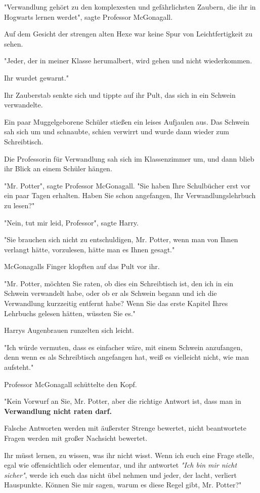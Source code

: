 {"Verwandlung gehört zu den komplexesten und gefährlichsten Zaubern, die ihr in Hogwarts lernen werdet", sagte Professor McGonagall.

Auf dem Gesicht der strengen alten Hexe war keine Spur von Leichtfertigkeit zu sehen.

"Jeder, der in meiner Klasse herumalbert, wird gehen und nicht wiederkommen.

Ihr wurdet gewarnt."

Ihr Zauberstab senkte sich und tippte auf ihr Pult, das sich in ein Schwein verwandelte.

Ein paar Muggelgeborene Schüler stießen ein leises Aufjaulen aus. Das Schwein sah sich um und schnaubte, schien verwirrt und wurde dann wieder zum Schreibtisch.

Die Professorin für Verwandlung sah sich im Klassenzimmer um, und dann blieb ihr Blick an einem Schüler hängen.

"Mr. Potter", sagte Professor McGonagall. "Sie haben Ihre Schulbücher erst vor ein paar Tagen erhalten. Haben Sie schon angefangen, Ihr Verwandlungslehrbuch zu lesen?"

"Nein, tut mir leid, Professor", sagte Harry.

"Sie brauchen sich nicht zu entschuldigen, Mr. Potter, wenn man von Ihnen verlangt hätte, vorzulesen, hätte man es Ihnen gesagt."

McGonagalls Finger klopften auf das Pult vor ihr.

"Mr. Potter, möchten Sie raten, ob dies ein Schreibtisch ist, den ich in ein Schwein verwandelt habe, oder ob er als Schwein begann und ich die Verwandlung kurzzeitig entfernt habe? Wenn Sie das erste Kapitel Ihres Lehrbuchs gelesen hätten, wüssten Sie es."

Harrys Augenbrauen runzelten sich leicht.

"Ich würde vermuten, dass es einfacher wäre, mit einem Schwein anzufangen, denn wenn es als Schreibtisch angefangen hat, weiß es vielleicht nicht, wie man aufsteht."

Professor McGonagall schüttelte den Kopf.

"Kein Vorwurf an Sie, Mr. Potter, aber die richtige Antwort ist, dass man in \textbf{Verwandlung nicht raten darf.}

Falsche Antworten werden mit äußerster Strenge bewertet, nicht beantwortete Fragen werden mit großer Nachsicht bewertet.

Ihr müsst lernen, zu wissen, was ihr nicht wisst. Wenn ich euch eine Frage stelle, egal wie offensichtlich oder elementar, und ihr antwortet \emph{"Ich bin mir nicht sicher"}, werde ich euch das nicht übel nehmen und jeder, der lacht, verliert Hauspunkte. Können Sie mir sagen, warum es diese Regel gibt, Mr. Potter?"

}
